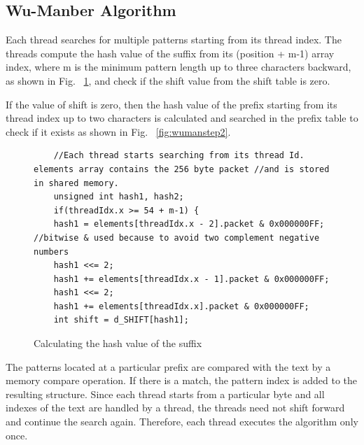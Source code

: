 \subsection{Wu-Manber Algorithm}
Each thread searches for multiple patterns starting from its thread index. The threads compute the hash value of the suffix from its (position + m-1) array index, where m is the minimum pattern length up to three characters backward, as shown in Fig. ~\ref{fig:wumanstep1}, and check if the shift value from the shift table is zero. 

If the value of shift is zero, then the hash value of the prefix starting from its thread index up to two characters is calculated and searched in the prefix table to check if it exists as shown in Fig. ~\ref{fig:wumanstep2}. 

\begin{figure}[H]
	\begin{lstlisting}
	//Each thread starts searching from its thread Id. elements array contains the 256 byte packet //and is stored in shared memory.
	unsigned int hash1, hash2;
	if(threadIdx.x >= 54 + m-1) {
	hash1 = elements[threadIdx.x - 2].packet & 0x000000FF; //bitwise & used because to avoid two complement negative numbers
	hash1 <<= 2;
	hash1 += elements[threadIdx.x - 1].packet & 0x000000FF;
	hash1 <<= 2;
	hash1 += elements[threadIdx.x].packet & 0x000000FF;
	int shift = d_SHIFT[hash1];
	\end{lstlisting}
	\caption{Calculating the hash value of the suffix}
	\label{fig:wumanstep1}
\end{figure}
\squeezeup

The patterns located at a particular prefix are compared with the text by a memory compare operation. If there is a match, the pattern index is added to the resulting structure. Since each thread starts from a particular byte and all indexes of the text are handled by a thread, the threads need not shift forward and continue the search again. Therefore, each thread executes the algorithm only once.

